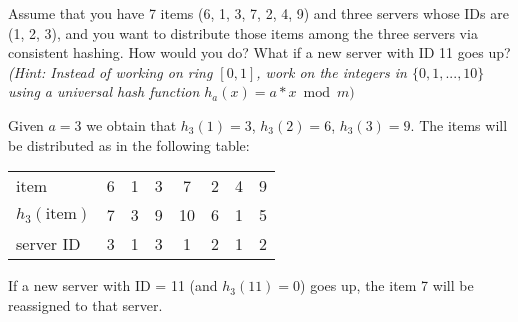 \exercise

Assume that you have 7 items (6, 1, 3, 7, 2, 4, 9) and three servers whose IDs
are (1, 2, 3), and you want to distribute those items among the three servers
via consistent hashing. How would you do? What if a new server with ID 11 goes
up? \emph{(Hint: Instead of working on ring $[0,1]$, work on the integers in
$\{0,1, ... ,10\}$ using a universal hash function $h_a(x)= a*x \bmod m)$}

\solution

Given $a = 3$ we obtain that $h_3(1) = 3$, $h_3(2) = 6$, $h_3(3) = 9$. The items will be distributed as in the following table:
%
\begin{table}[h]
  \centering
  \begin{tabular}{l|c|c|c|c|c|c|c}
    item & 6 & 1 & 3 & 7 & 2 & 4 & 9 \\
    $h_3(\text{item})$ & 7 & 3 & 9 & 10 & 6 & 1 & 5 \\ \hline
    server ID & 3 & 1 & 3 & 1 & 2 & 1 & 2 \\
  \end{tabular}
\end{table}

If a new server with ID = 11 (and $h_3(11) = 0$) goes up, the item 7 will be
reassigned to that server.
